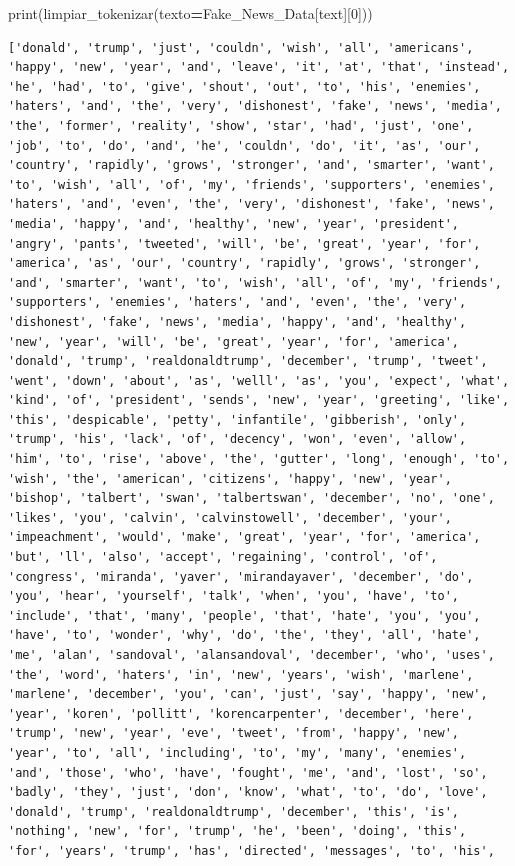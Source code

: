 \documentclass[
  11pt,
  a4paper,
]{article}
\newenvironment{Shaded}{\begin{snugshade}}{\end{snugshade}}
\newcommand{\BuiltInTok}[1]{#1}
\newcommand{\DecValTok}[1]{\textcolor[rgb]{0.00,0.00,0.81}{#1}}
\newcommand{\NormalTok}[1]{#1}
\newcommand{\OperatorTok}[1]{\textcolor[rgb]{0.81,0.36,0.00}{\textbf{#1}}}
\newcommand{\StringTok}[1]{\textcolor[rgb]{0.31,0.60,0.02}{#1}}
\begin{document}
\begin{Shaded}
\begin{Highlighting}[]
\BuiltInTok{print}\NormalTok{(limpiar\_tokenizar(texto}\OperatorTok{=}\NormalTok{Fake\_News\_Data[}\StringTok{\textquotesingle{}text\textquotesingle{}}\NormalTok{][}\DecValTok{0}\NormalTok{]))}
\end{Highlighting}
\end{Shaded}

\begin{verbatim}
['donald', 'trump', 'just', 'couldn', 'wish', 'all', 'americans', 'happy', 'new', 'year', 'and', 'leave', 'it', 'at', 'that', 'instead', 'he', 'had', 'to', 'give', 'shout', 'out', 'to', 'his', 'enemies', 'haters', 'and', 'the', 'very', 'dishonest', 'fake', 'news', 'media', 'the', 'former', 'reality', 'show', 'star', 'had', 'just', 'one', 'job', 'to', 'do', 'and', 'he', 'couldn', 'do', 'it', 'as', 'our', 'country', 'rapidly', 'grows', 'stronger', 'and', 'smarter', 'want', 'to', 'wish', 'all', 'of', 'my', 'friends', 'supporters', 'enemies', 'haters', 'and', 'even', 'the', 'very', 'dishonest', 'fake', 'news', 'media', 'happy', 'and', 'healthy', 'new', 'year', 'president', 'angry', 'pants', 'tweeted', 'will', 'be', 'great', 'year', 'for', 'america', 'as', 'our', 'country', 'rapidly', 'grows', 'stronger', 'and', 'smarter', 'want', 'to', 'wish', 'all', 'of', 'my', 'friends', 'supporters', 'enemies', 'haters', 'and', 'even', 'the', 'very', 'dishonest', 'fake', 'news', 'media', 'happy', 'and', 'healthy', 'new', 'year', 'will', 'be', 'great', 'year', 'for', 'america', 'donald', 'trump', 'realdonaldtrump', 'december', 'trump', 'tweet', 'went', 'down', 'about', 'as', 'welll', 'as', 'you', 'expect', 'what', 'kind', 'of', 'president', 'sends', 'new', 'year', 'greeting', 'like', 'this', 'despicable', 'petty', 'infantile', 'gibberish', 'only', 'trump', 'his', 'lack', 'of', 'decency', 'won', 'even', 'allow', 'him', 'to', 'rise', 'above', 'the', 'gutter', 'long', 'enough', 'to', 'wish', 'the', 'american', 'citizens', 'happy', 'new', 'year', 'bishop', 'talbert', 'swan', 'talbertswan', 'december', 'no', 'one', 'likes', 'you', 'calvin', 'calvinstowell', 'december', 'your', 'impeachment', 'would', 'make', 'great', 'year', 'for', 'america', 'but', 'll', 'also', 'accept', 'regaining', 'control', 'of', 'congress', 'miranda', 'yaver', 'mirandayaver', 'december', 'do', 'you', 'hear', 'yourself', 'talk', 'when', 'you', 'have', 'to', 'include', 'that', 'many', 'people', 'that', 'hate', 'you', 'you', 'have', 'to', 'wonder', 'why', 'do', 'the', 'they', 'all', 'hate', 'me', 'alan', 'sandoval', 'alansandoval', 'december', 'who', 'uses', 'the', 'word', 'haters', 'in', 'new', 'years', 'wish', 'marlene', 'marlene', 'december', 'you', 'can', 'just', 'say', 'happy', 'new', 'year', 'koren', 'pollitt', 'korencarpenter', 'december', 'here', 'trump', 'new', 'year', 'eve', 'tweet', 'from', 'happy', 'new', 'year', 'to', 'all', 'including', 'to', 'my', 'many', 'enemies', 'and', 'those', 'who', 'have', 'fought', 'me', 'and', 'lost', 'so', 'badly', 'they', 'just', 'don', 'know', 'what', 'to', 'do', 'love', 'donald', 'trump', 'realdonaldtrump', 'december', 'this', 'is', 'nothing', 'new', 'for', 'trump', 'he', 'been', 'doing', 'this', 'for', 'years', 'trump', 'has', 'directed', 'messages', 'to', 'his', 
\end{verbatim}
\end{document}
